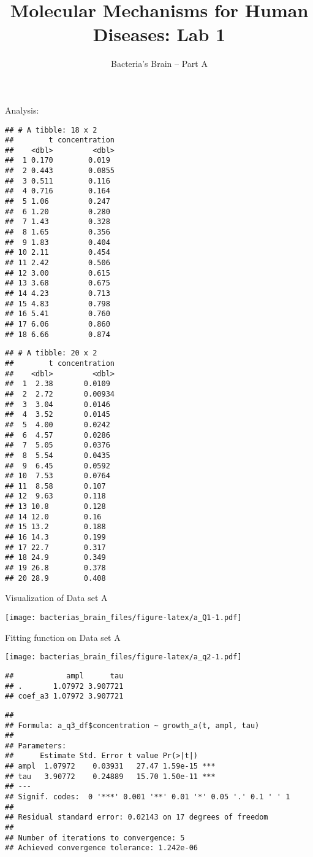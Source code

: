 \documentclass[
]{article}
\title{Molecular Mechanisms for Human Diseases: Lab 1}
\subtitle{Bacteria's Brain -- Part A}
\author{}
\date{\vspace{-2.5em}}
\begin{document}
\maketitle

{
\setcounter{tocdepth}{2}
\tableofcontents
}
Analysis:

\begin{verbatim}
## # A tibble: 18 x 2
##        t concentration
##    <dbl>         <dbl>
##  1 0.170        0.019 
##  2 0.443        0.0855
##  3 0.511        0.116 
##  4 0.716        0.164 
##  5 1.06         0.247 
##  6 1.20         0.280 
##  7 1.43         0.328 
##  8 1.65         0.356 
##  9 1.83         0.404 
## 10 2.11         0.454 
## 11 2.42         0.506 
## 12 3.00         0.615 
## 13 3.68         0.675 
## 14 4.23         0.713 
## 15 4.83         0.798 
## 16 5.41         0.760 
## 17 6.06         0.860 
## 18 6.66         0.874
\end{verbatim}

\begin{verbatim}
## # A tibble: 20 x 2
##        t concentration
##    <dbl>         <dbl>
##  1  2.38       0.0109 
##  2  2.72       0.00934
##  3  3.04       0.0146 
##  4  3.52       0.0145 
##  5  4.00       0.0242 
##  6  4.57       0.0286 
##  7  5.05       0.0376 
##  8  5.54       0.0435 
##  9  6.45       0.0592 
## 10  7.53       0.0764 
## 11  8.58       0.107  
## 12  9.63       0.118  
## 13 10.8        0.128  
## 14 12.0        0.16   
## 15 13.2        0.188  
## 16 14.3        0.199  
## 17 22.7        0.317  
## 18 24.9        0.349  
## 19 26.8        0.378  
## 20 28.9        0.408
\end{verbatim}

Visualization of Data set A

\texttt{[image: bacterias\_brain\_files/figure-latex/a\_Q1-1.pdf]}

Fitting function on Data set A

\texttt{[image: bacterias\_brain\_files/figure-latex/a\_q2-1.pdf]}

\begin{verbatim}
##            ampl      tau
## .       1.07972 3.907721
## coef_a3 1.07972 3.907721
\end{verbatim}

\begin{verbatim}
## 
## Formula: a_q3_df$concentration ~ growth_a(t, ampl, tau)
## 
## Parameters:
##      Estimate Std. Error t value Pr(>|t|)    
## ampl  1.07972    0.03931   27.47 1.59e-15 ***
## tau   3.90772    0.24889   15.70 1.50e-11 ***
## ---
## Signif. codes:  0 '***' 0.001 '**' 0.01 '*' 0.05 '.' 0.1 ' ' 1
## 
## Residual standard error: 0.02143 on 17 degrees of freedom
## 
## Number of iterations to convergence: 5 
## Achieved convergence tolerance: 1.242e-06
\end{verbatim}
\end{document}

